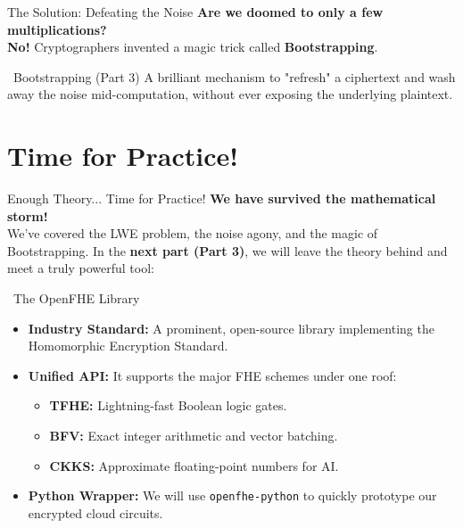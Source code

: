 \documentclass[aspectratio=169, 10pt]{beamer}
\begin{document}
\begin{frame}{The Solution: Defeating the Noise}
    \Large
    \textbf{Are we doomed to only a few multiplications?} \\[0.4cm]

    \normalsize
    \textbf{No!} Cryptographers invented a magic trick called \textbf{Bootstrapping}.
    \vspace{0.5cm}
    
    \begin{exampleblock}{\faLightbulb \ Bootstrapping (Part 3)}
        \vspace{0.1cm}
        A brilliant mechanism to "refresh" a ciphertext and wash away the noise mid-computation, without ever exposing the underlying plaintext. \\
        \vspace{0.1cm}
    \end{exampleblock}
\end{frame}

\section{Time for Practice!}
\begin{frame}{Enough Theory... Time for Practice!}
    \Large
    \textbf{We have survived the mathematical storm!} \\[0.2cm]

    \normalsize
    We've covered the LWE problem, the noise agony, and the magic of Bootstrapping. In the \textbf{next part (Part 3)}, we will leave the theory behind and meet a truly powerful tool:
    \vspace{0.3cm}

    \begin{block}{\faCode \ The OpenFHE Library}
        \begin{itemize}
            \item \textbf{Industry Standard:} A prominent, open-source library implementing the Homomorphic Encryption Standard.
            \item \textbf{Unified API:} It supports the major FHE schemes under one roof:
            \begin{itemize}
                \item \normalsize \textbf{TFHE:} Lightning-fast Boolean logic gates.
                \item \normalsize \textbf{BFV:} Exact integer arithmetic and vector batching.
                \item \normalsize \textbf{CKKS:} Approximate floating-point numbers for AI.
            \end{itemize}
            \item \textbf{Python Wrapper:} We will use \texttt{openfhe-python} to quickly prototype our encrypted cloud circuits.
        \end{itemize}
    \end{block}
\end{frame}
\end{document}
